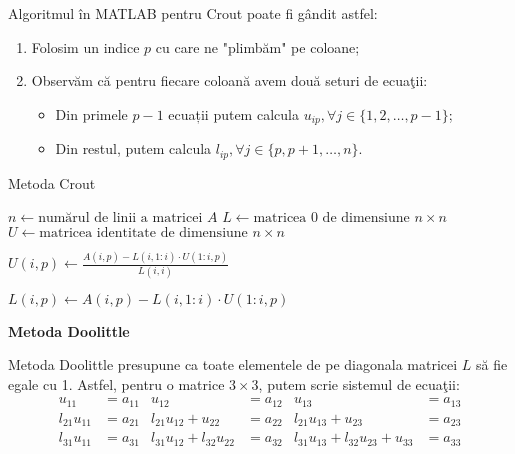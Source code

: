 \documentclass{exam}
\newcommand{\octavescript}[2]{
	
}
\begin{document}
\par Algoritmul în MATLAB pentru Crout poate fi gândit astfel:

\begin{enumerate}
	\item Folosim un indice $p$ cu care ne "plimbăm" pe coloane;
	\item Observăm că pentru fiecare coloană avem două seturi de ecuaţii:
	      \begin{itemize}
		      \item Din primele $p - 1$ ecuații putem calcula $u_{ip}, \forall j \in \{1, 2, \ldots, p - 1\}$;
		      \item Din restul, putem calcula $l_{ip}, \forall j \in \{p, p + 1, \ldots, n\}$.
	      \end{itemize}
\end{enumerate}

\newpage

\begin{algorithm}
	\caption{Metoda Crout}
	\begin{algorithmic}[1]
		\State \( n \gets \text{numărul de linii a matricei } A \)
		\State \( L \gets \text{matricea 0 de dimensiune } n \times n \)
		\State \( U \gets \text{matricea identitate de dimensiune } n \times n \)

		\State \( U(i, p) \gets \frac{A(i, p) - L(i, 1:i) \cdot U(1:i, p)}{L(i, i)} \)
		\EndFor

		\State \( L(i, p) \gets A(i, p) - L(i, 1:i) \cdot U(1:i, p) \)
		\EndFor
		\EndFor
	\end{algorithmic}
\end{algorithm}

\textbf{Metoda Doolittle}

Metoda Doolittle presupune ca toate elementele de pe diagonala matricei $L$
să fie egale cu 1. Astfel, pentru o matrice $3 \times 3$, putem scrie sistemul
de ecuaţii:
\begin{align*}
	u_{11}       & = a_{11} & u_{12}                      & = a_{12} & u_{13}                               & = a_{13} \\
	l_{21}u_{11} & = a_{21} & l_{21}u_{12} + u_{22}       & = a_{22} & l_{21}u_{13} + u_{23}                & = a_{23} \\
	l_{31}u_{11} & = a_{31} & l_{31}u_{12} + l_{32}u_{22} & = a_{32} & l_{31}u_{13} + l_{32}u_{23} + u_{33} & = a_{33}
\end{align*}
\end{document}
